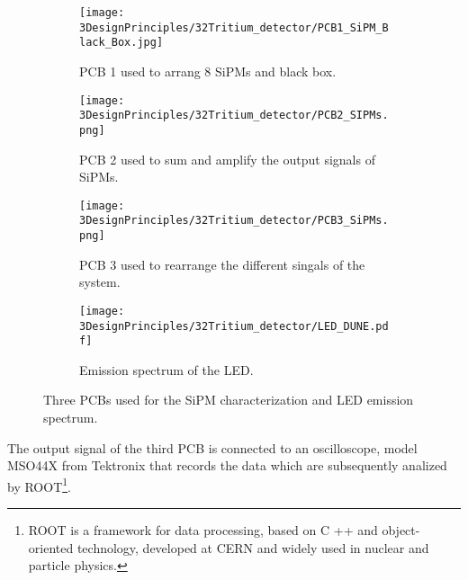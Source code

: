 \begin{figure}
\centering
    \begin{subfigure}[b]{0.5\textwidth}
    \centering
    \texttt{[image: 3DesignPrinciples/32Tritium\_detector/PCB1\_SiPM\_Black\_Box.jpg]}  
    \caption{PCB 1 used to arrang 8 SiPMs and black box.\label{subfig:PCB1}}
    \end{subfigure}
    \hfill
    \begin{subfigure}[b]{0.45\textwidth}
    \centering
    \texttt{[image: 3DesignPrinciples/32Tritium\_detector/PCB2\_SIPMs.png]}  
    \caption{PCB 2 used to sum and amplify the output signals of SiPMs.\label{subfig:PCB2}}
    \end{subfigure}
    \hfill
    \begin{subfigure}[b]{0.4\textwidth}
    \centering
    \texttt{[image: 3DesignPrinciples/32Tritium\_detector/PCB3\_SiPMs.png]}  
    \caption{PCB 3 used to rearrange the different singals of the system.\label{subfig:PCB3}}
    \end{subfigure}
    \hfill
    \begin{subfigure}[b]{0.5\textwidth}
    \centering
    \texttt{[image: 3DesignPrinciples/32Tritium\_detector/LED\_DUNE.pdf]}  
    \caption{Emission spectrum of the LED.\label{subfig:LEDSpectrum}}
    \end{subfigure}
 \caption{Three PCBs used for the SiPM characterization and LED emission spectrum.}
 \label{fig:PCBs_LEDSpectrum}
\end{figure}

The output signal of the third PCB is connected to an oscilloscope, model MSO44X from Tektronix \cite{Oscilloscope} that records the data which are subsequently analized by ROOT\footnote{ROOT is a framework for data processing, based on C ++ and object-oriented technology, developed at CERN and widely used in nuclear and particle physics.}.